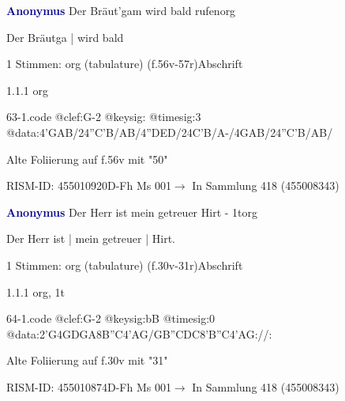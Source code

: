 \documentclass[twocolumn, 12pt]{book}
\begin{document}
\par \vspace{16pt} \textcolor{darkblue}{\textbf{Anonymus  }}\hfillplus{\textbf{[63]}}\newline Der Bräut'gam wird bald rufen\newline org
\par \begin{itshape}[f.56v, at left:] Der Bräutga | wird bald\end{itshape} 
\par \textcolor{darkblue}{}  1 Stimmen: org (tabulature)  (f.56v-57r)\newline Abschrift
\par 1.1.1  org  
\begin{filecontents*}{63-1.code}
@clef:G-2
@keysig:
@timesig:3
@data:4'GAB/24''C'B/AB/4''DED/24C'B/A-/4GAB/24''C'B/AB/
\end{filecontents*}
\newline %
\par Alte Foliierung auf f.56v mit "50"
\par RISM-ID: 455010920\newline D-Fh  Ms 001\newline $\rightarrow$ In Sammlung 418 (455008343)
      
\par \vspace{16pt} \textcolor{darkblue}{\textbf{Anonymus  }}\hfillplus{\textbf{[64]}}\newline Der Herr ist mein getreuer Hirt - 1t\newline org
\par \begin{itshape}[f.30v, at left:] Der Herr ist | mein getreuer | Hirt.\end{itshape} 
\par \textcolor{darkblue}{}  1 Stimmen: org (tabulature)  (f.30v-31r)\newline Abschrift
\par 1.1.1  org, 1t  
\begin{filecontents*}{64-1.code}
@clef:G-2
@keysig:bB
@timesig:0
@data:2'G4GDGA{8B''C}4'AG/GB''CDC{8'B''C}4'AG://:
\end{filecontents*}
\newline %
\par Alte Foliierung auf f.30v mit "31"
\par RISM-ID: 455010874\newline D-Fh  Ms 001\newline $\rightarrow$ In Sammlung 418 (455008343)
      
\end{document}
